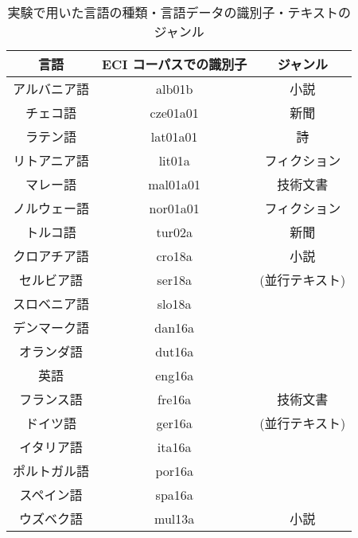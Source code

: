\begin{table}
\caption{実験で用いた言語の種類・言語データの識別子・テキストのジャンル} \label{Tab:ECI_data}
\begin{center}
\begin{tabular}{c|c|c}
\hline
言語            & ECI コーパスでの識別子        &       ジャンル        \\
\hline
\hline
アルバニア語    & alb01b        &       小説            \\ \hline
チェコ語        & cze01a01      &       新聞            \\ \hline
ラテン語        & lat01a01      &       詩              \\ \hline
リトアニア語    & lit01a        &       フィクション    \\ \hline
マレー語        & mal01a01      &       技術文書        \\ \hline
ノルウェー語    & nor01a01      &       フィクション    \\ \hline
トルコ語        & tur02a        &       新聞            \\ \hline

クロアチア語    & cro18a        &       小説            \\ \cline{1-2}
セルビア語      & ser18a        &       (並行テキスト)  \\ \cline{1-2}
スロベニア語    & slo18a        &                       \\ \hline

デンマーク語    & dan16a        &                       \\ \cline{1-2}
オランダ語      & dut16a        &                       \\ \cline{1-2}
英語            & eng16a        &                       \\ \cline{1-2}
フランス語      & fre16a        &       技術文書        \\ \cline{1-2}
ドイツ語        & ger16a        &       (並行テキスト)  \\ \cline{1-2}
イタリア語      & ita16a        &                       \\ \cline{1-2}
ポルトガル語    & por16a        &                       \\ \cline{1-2}
スペイン語      & spa16a        &                       \\ \hline

ウズベク語      & mul13a        &       小説            \\ \hline
\end{tabular}
\end{center}
\end{table}

